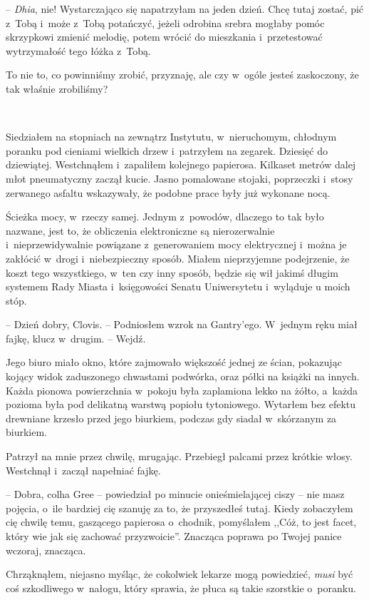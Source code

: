 \documentclass[oneside,polish,11pt,sfheadings]{mwbk}
\begin{document}
-- \textit{Dhia}, nie! Wystarczająco się napatrzyłam na jeden dzień. Chcę
tutaj zostać, pić z~Tobą i~może z~Tobą potańczyć, jeżeli odrobina srebra
mogłaby pomóc skrzypkowi zmienić melodię, potem wrócić do mieszkania i~przetestować wytrzymałość tego łóżka z~Tobą.

To nie to, co powinniśmy zrobić, przyznaję, ale czy w~ogóle jesteś
zaskoczony, że tak właśnie zrobiliśmy?

~

Siedziałem na stopniach na zewnątrz Instytutu, w~nieruchomym, chłodnym
poranku pod cieniami wielkich drzew i~patrzyłem na zegarek. Dziesięć do
dziewiątej. Westchnąłem i~zapaliłem kolejnego papierosa. Kilkaset metrów
dalej młot pneumatyczny zaczął kucie. Jasno pomalowane stojaki,
poprzeczki i~stosy zerwanego asfaltu wskazywały, że podobne prace były
już wykonane nocą.

Ścieżka mocy, w~rzeczy samej. Jednym z~powodów, dlaczego to tak było
nazwane, jest to, że obliczenia elektroniczne są nierozerwalnie i~nieprzewidywalnie powiązane z~generowaniem mocy elektrycznej i~można je
zakłócić w~drogi i~niebezpieczny sposób. Miałem nieprzyjemne
podejrzenie, że koszt tego wszystkiego, w~ten czy inny sposób, będzie
się wił jakimś długim systemem Rady Miasta i~księgowości Senatu
Uniwersytetu i~wyląduje u moich stóp.

-- Dzień dobry, Clovis. -- Podniosłem wzrok na Gantry'ego. W~jednym ręku
miał fajkę, klucz w~drugim. -- Wejdź.

Jego biuro miało okno, które zajmowało większość jednej ze ścian,
pokazując kojący widok zaduszonego chwastami podwórka, oraz półki na
książki na innych. Każda pionowa powierzchnia w~pokoju była zaplamiona
lekko na żółto, a~każda pozioma była pod delikatną warstwą popiołu
tytoniowego. Wytarłem bez efektu drewniane krzesło przed jego biurkiem,
podczas gdy siadał w~skórzanym za biurkiem.

Patrzył na mnie przez chwilę, mrugając. Przebiegł palcami przez krótkie
włosy. Westchnął i~zaczął napełniać fajkę.

-- Dobra, colha Gree -- powiedział po minucie onieśmielającej ciszy -- nie
masz pojęcia, o~ile bardziej cię szanuję za to, że przyszedłeś tutaj.
Kiedy zobaczyłem cię chwilę temu, gaszącego papierosa o~chodnik,
pomyślałem ,,Cóż, to jest facet, który wie jak się zachować
przyzwoicie''. Znacząca poprawa po Twojej panice wczoraj, znacząca.

Chrząknąłem, niejasno myśląc, że cokolwiek lekarze mogą powiedzieć,
\textit{musi} być coś szkodliwego w~nałogu, który sprawia, że płuca są
takie szorstkie o~poranku. 
\end{document}

